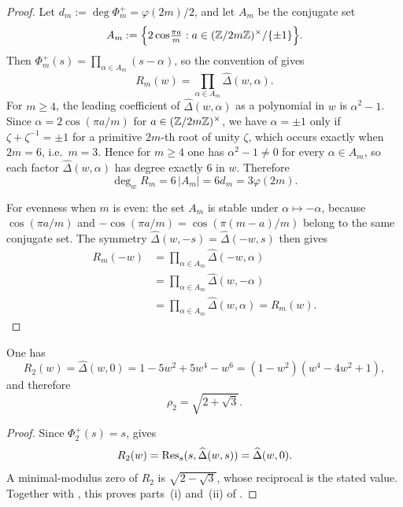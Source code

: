 \begin{proof}

Let \(d_m:=\deg\Phi_m^+=\varphi(2m)/2\), and let \(A_m\) be the
conjugate set
\[
  A_m:=\Bigl\{2\cos\!\tfrac{\pi a}{m}:a\in(\mathbb{Z}/2m\mathbb{Z})^\times/\{\pm 1\}\Bigr\}.
\]
Then \(\Phi_m^+(s)=\prod_{\alpha\in A_m}(s-\alpha)\), so the convention
of  gives
\[
  R_m(w)
  =
    \prod_{\alpha\in A_m}\widehat\Delta(w,\alpha).
\]
For \(m\ge 4\), the leading coefficient of \(\widehat\Delta(w,\alpha)\)
as a polynomial in \(w\) is \(\alpha^2-1\). Since \(\alpha=2\cos(\pi a/m)\)
for \(a\in(\mathbb{Z}/2m\mathbb{Z})^\times\), we have \(\alpha=\pm 1\) only if
\(\zeta+\zeta^{-1}=\pm 1\) for a primitive \(2m\)-th root of unity
\(\zeta\), which occurs exactly when \(2m=6\), i.e.\ \(m=3\). Hence
for \(m\ge 4\) one has \(\alpha^2-1\neq 0\) for every \(\alpha\in A_m\),
so each factor \(\widehat\Delta(w,\alpha)\) has degree exactly \(6\) in
\(w\). Therefore
\[
  \deg_w R_m=6\,|A_m|=6d_m=3\varphi(2m).
\]

For evenness when \(m\) is even: the set \(A_m\) is stable under
\(\alpha\mapsto-\alpha\), because \(\cos(\pi a/m)\) and
\(-\cos(\pi a/m)=\cos(\pi(m-a)/m)\) belong to the same conjugate set.
The symmetry \(\widehat\Delta(w,-s)=\widehat\Delta(-w,s)\) then gives
\[
\begin{aligned}
  R_m(-w)
  &=
    \prod_{\alpha\in A_m}\widehat\Delta(-w,\alpha) \\
  &=
    \prod_{\alpha\in A_m}\widehat\Delta(w,-\alpha) \\
  &=
    \prod_{\alpha\in A_m}\widehat\Delta(w,\alpha)
    =R_m(w).
\end{aligned}
\]

\end{proof}

\begin{corollary}[The twist \(m=2\)]
  \label{cor:rho-m2-closed-form}
  One has
\[
    R_2(w)=\widehat\Delta(w,0)
    =1-5w^2+5w^4-w^6
    =(1-w^2)(w^4-4w^2+1),
\]
  and therefore
\[
    \rho_2=\sqrt{2+\sqrt3}.
\]
\end{corollary}

\begin{proof}
Since \(\Phi_2^+(s)=s\),  gives
\[
  R_2(w)=\operatorname{Res}_s(s,\widehat\Delta(w,s))=\widehat\Delta(w,0).
\]
A minimal-modulus zero of \(R_2\) is \(\sqrt{2-\sqrt3}\), whose
reciprocal is the stated value. Together with
, this proves
parts~\textup{(i)} and~\textup{(ii)} of
.
\end{proof}

